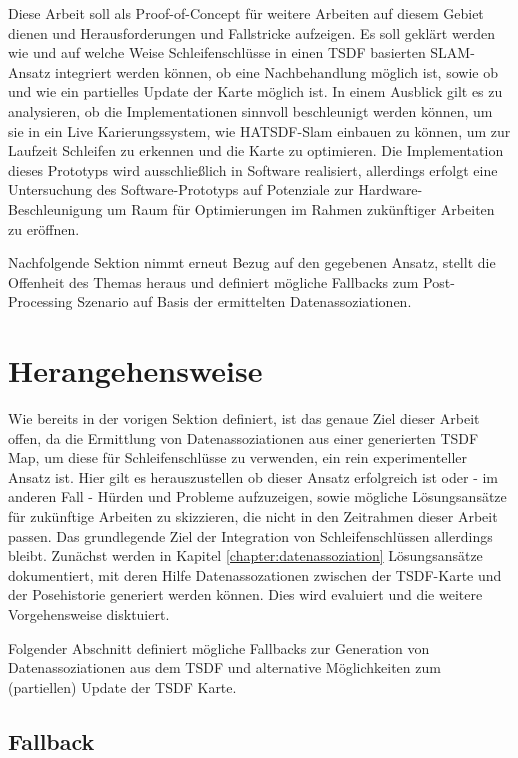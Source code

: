 Diese Arbeit soll als Proof-of-Concept für weitere Arbeiten auf diesem Gebiet dienen und Herausforderungen und Fallstricke aufzeigen. Es soll geklärt werden wie und auf welche Weise Schleifenschlüsse in einen TSDF basierten SLAM-Ansatz integriert werden können, ob eine Nachbehandlung möglich ist, sowie ob und wie ein partielles Update der Karte möglich ist.
In einem Ausblick gilt es zu analysieren, ob die Implementationen sinnvoll beschleunigt werden können, um sie in ein Live Karierungssystem, wie HATSDF-Slam einbauen zu können, um zur Laufzeit Schleifen zu erkennen und die Karte zu optimieren.
Die Implementation dieses Prototyps wird ausschließlich in Software realisiert, allerdings erfolgt eine Untersuchung des Software-Prototyps auf Potenziale zur Hardware-Beschleunigung um Raum für Optimierungen im Rahmen zukünftiger Arbeiten zu eröffnen.

Nachfolgende Sektion nimmt erneut Bezug auf den gegebenen Ansatz, stellt die Offenheit des Themas heraus und definiert mögliche Fallbacks zum Post-Processing Szenario auf Basis der ermittelten Datenassoziationen.

\section{Herangehensweise}
\label{section:herangehensweise}

Wie bereits in der vorigen Sektion definiert, ist das genaue Ziel dieser Arbeit offen, da die Ermittlung von Datenassoziationen aus einer generierten TSDF Map, um diese für Schleifenschlüsse zu verwenden, ein rein experimenteller Ansatz ist.
Hier gilt es herauszustellen ob dieser Ansatz erfolgreich ist oder - im anderen Fall - Hürden und Probleme aufzuzeigen, sowie mögliche Lösungsansätze für zukünftige Arbeiten zu skizzieren, die nicht in den Zeitrahmen dieser Arbeit passen.
Das grundlegende Ziel der Integration von Schleifenschlüssen allerdings bleibt.
Zunächst werden in Kapitel \ref{chapter:datenassoziation} Lösungsansätze dokumentiert, mit deren Hilfe Datenassozationen zwischen der TSDF-Karte und der Posehistorie generiert werden können. Dies wird evaluiert und die weitere Vorgehensweise disktuiert.

Folgender Abschnitt definiert mögliche Fallbacks zur Generation von Datenassoziationen aus dem TSDF und alternative Möglichkeiten zum (partiellen) Update der TSDF Karte.

\subsection{Fallback}
\label{section:fallback}

